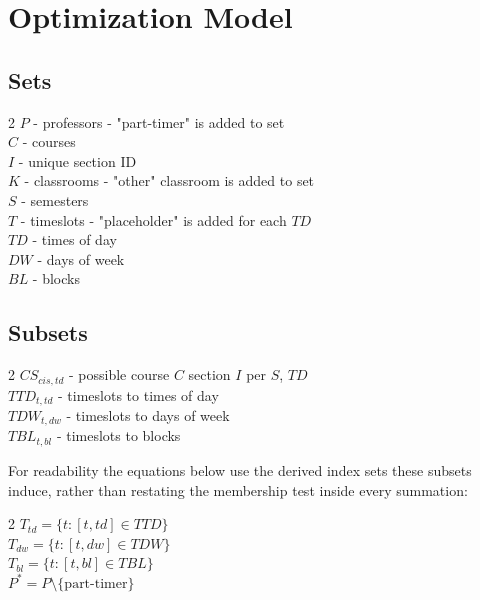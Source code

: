 \documentclass[11pt, oneside]{article}   	%
\begin{document}
\section{Optimization Model}





\subsection{Sets}
\begin{multicols}{2}
	$P$ - professors - "part-timer" is added to set\\
	$C$ - courses\\
	$I$ - unique section ID \\ 
	$K$ - classrooms - "other" classroom is added to set\\
	$S$ - semesters \\
	$T$ - timeslots  - "placeholder" is added for each $TD$\\
	$TD$ - times of day\\
	$DW$ - days of week \\
	$BL$ - blocks
\end{multicols}





\subsection{Subsets}
\begin{multicols}{2}
	$CS_{cis,td}$ - possible course $C$ section $I$ per $S$, $TD$ \\
	$TTD_{t,td}$ - timeslots to times of day \\
	$TDW_{t,dw}$ - timeslots to days of week \\
	$TBL_{t,bl}$ - timeslots to blocks
\end{multicols}

For readability the equations below use the derived index sets these subsets
induce, rather than restating the membership test inside every summation:

\begin{multicols}{2}
	$T_{td} = \{ t : [t,td] \in TTD \}$ \\
	$T_{dw} = \{ t : [t,dw] \in TDW \}$ \\
	$T_{bl} = \{ t : [t,bl] \in TBL \}$ \\
	$P^{*} = P \setminus \{ \text{part-timer} \}$
\end{multicols}
\end{document}
